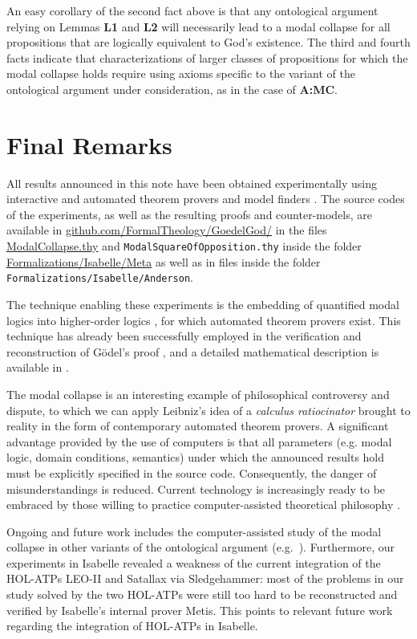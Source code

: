 \documentclass{birkmult}
\theoremstyle{definition}
\theoremstyle{remark}
\numberwithin{equation}{section}
\begin{document}
An easy corollary of the second fact above is that any ontological argument relying on Lemmas \textbf{L1} and \textbf{L2} will necessarily lead to a modal collapse for all propositions that are logically equivalent to God's existence. The third and fourth facts indicate that characterizations of larger classes of propositions for which the modal collapse holds require using axioms specific to the variant of the ontological argument under consideration, as in the case of \textbf{A:MC}.



\section{Final Remarks}

\sloppy All results announced in this note have been 
obtained experimentally using interactive and 
automated theorem provers and model finders
\cite{LEO,Satallax,Isabelle,Coq,Nitpick}.  
The source codes of the experiments, 
as well as the resulting proofs and counter-models, 
are available in
\url{github.com/FormalTheology/GoedelGod/}
in the files \url{ModalCollapse.thy} and \texttt{ModalSquareOfOpposition.thy} inside the folder \url{Formalizations/Isabelle/Meta} as well as in files inside the folder \texttt{Formalizations/Isabelle/Anderson}.

The technique enabling these experiments is the embedding of 
quantified modal logics into higher-order logics 
\cite{J23,B9,C36}, for which automated theorem provers exist. 
This technique has already been successfully employed in the 
verification and reconstruction of G\"odel's proof 
\cite{J28,J30,J29}, and a detailed 
mathematical description is available in \cite{C40}.

The modal collapse is an interesting example of philosophical 
controversy and dispute, to which we can apply Leibniz's idea 
of a \emph{calculus ratiocinator} brought to reality in the 
form of contemporary automated theorem provers. 
A significant advantage provided by the use of computers is 
that all parameters (e.g. modal logic, domain conditions, 
semantics) under which the announced results hold must be 
explicitly specified in the source code. Consequently, 
the danger of misunderstandings is reduced. 
Current technology is increasingly ready to be embraced by 
those willing to practice computer-assisted theoretical 
philosophy \cite{oppenheimera11,rushby13}.

Ongoing and future work includes the computer-assisted 
study of the modal collapse in
other variants of the ontological argument (e.g.~\cite{bjordal99,fuhrmann05:_exist_notwen}). Furthermore, our experiments in Isabelle revealed a weakness of the current integration of the HOL-ATPs LEO-II and Satallax via Sledgehammer: most of the problems in our study solved by the two HOL-ATPs were still too hard to be reconstructed and verified by Isabelle's internal prover Metis. This points to relevant future work regarding the integration of HOL-ATPs in Isabelle.
 
\end{document}

